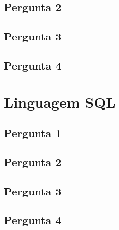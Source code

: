\documentclass[11pt,a4paper]{article}
\begin{document}
\subsection{Pergunta 2}
\subsection{Pergunta 3}
\subsection{Pergunta 4}

\section{Linguagem SQL}
\subsection{Pergunta 1}
\subsection{Pergunta 2}
\subsection{Pergunta 3}
\subsection{Pergunta 4}
\end{document}
